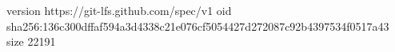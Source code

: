 version https://git-lfs.github.com/spec/v1
oid sha256:136c300dffaf594a3d4338c21e076cf5054427d272087c92b4397534f0517a43
size 22191
